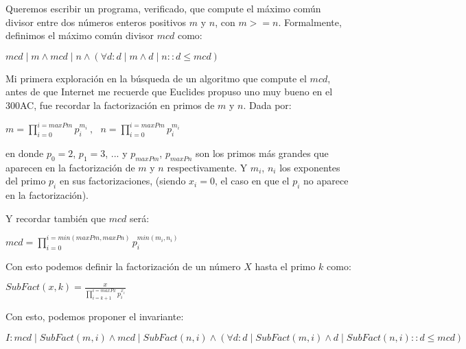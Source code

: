 \documentclass[12pt, a4paper, openany, fleqn]{book}
\begin{document}
    Queremos escribir un programa, verificado, que compute el máximo común divisor entre dos números enteros positivos $m$ y $n$,
    con $m >= n$. Formalmente, definimos el máximo común divisor $mcd$ como:

    \begin{center}
        \begin{math}
            mcd \mid m \land mcd \mid n \land (\forall d: d \mid m \land d \mid n :: d \leq mcd)
        \end{math}
    \end{center}

    Mi primera exploración en la búsqueda de un algoritmo que compute el $mcd$, antes de que Internet me recuerde que Euclides propuso uno muy bueno en el 300AC, fue recordar la factorización en primos de $m$ y $n$. Dada por:

    \begin{center}
        \begin{math}
            m = \prod_{i=0}^{i=maxPm} p_{i}^{m_i}\ , \ \ \ n = \prod_{i=0}^{i=maxPm} p_{i}^{m_i}
        \end{math}
    \end{center}

    en donde $p_0=2$, $p_1= 3$, ... y $p_{maxPm}$, $p_{maxPn}$ son los primos más grandes que aparecen en la factorización de $m$ y $n$ respectivamente. Y $m_i$, $n_i$ los exponentes del primo $p_i$ en sus factorizaciones, (siendo $x_i=0$, el caso en que el $p_i$ no aparece en la factorización).

    Y recordar también que $mcd$ será:

    \begin{center}
        \begin{math}
            mcd = \prod_{i=0}^{i=min(maxPm, maxPn)} p_{i}^{min(m_i, n_i)}
        \end{math}
    \end{center}

    Con esto podemos definir la factorización de un número $X$ hasta el primo $k$ como:
    \begin{center}
        \begin{math}
            SubFact(x, k) = \frac{x}{\prod_{i=k+1}^{i=maxPx} p_{i}^{x_i}} 
        \end{math}
    \end{center}

    Con esto, podemos proponer el invariante:
    \begin{center}
        \begin{math}
            I: mcd \mid SubFact(m, i) \land mcd \mid SubFact(n, i) \land (\forall d: d \mid SubFact(m, i) \land d \mid SubFact(n, i) :: d \leq mcd) 
        \end{math}
    \end{center}
\end{document}
